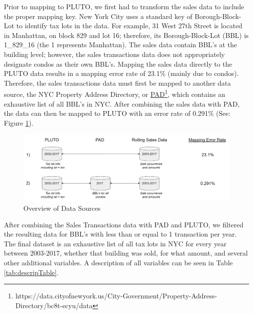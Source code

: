 \documentclass[conference,final,]{IEEEtran}
\makeatletter
\def\maxwidth{\ifdim\Gin@nat@width>\linewidth\linewidth
\else\Gin@nat@width\fi}
\let\Oldincludegraphics\includegraphics
\renewcommand{\includegraphics}[1]{\Oldincludegraphics[width=\maxwidth]{#1}}
\makeatother
\begin{document}
Prior to mapping to PLUTO, we first had to transform the sales data to
include the proper mapping key. New York City uses a standard key of
Borough-Block-Lot to identify tax lots in the data. For example, 31 West
27th Street is located in Manhattan, on block 829 and lot 16; therefore,
its Borough-Block-Lot (BBL) is 1\_829\_16 (the 1 represents Manhattan).
The sales data contain BBL's at the building level; however, the sales
transactions data does not appropriately designate condos as their own
BBL's. Mapping the sales data directly to the PLUTO data results in a
mapping error rate of 23.1\% (mainly due to condos). Therefore, the
sales transactions data must first be mapped to another data source, the
NYC Property Address Directory, or
\href{https://data.cityofnewyork.us/City-Government/Property-Address-Directory/bc8t-ecyu/data}{PAD}\footnote{https://data.cityofnewyork.us/City-Government/Property-Address-Directory/bc8t-ecyu/data},
which contains an exhaustive list of all BBL's in NYC. After combining
the sales data with PAD, the data can then be mapped to PLUTO with an
error rate of 0.291\% (See: Figure \ref{fig:Data Schema}).

\begin{figure}
\centering
\includegraphics{Sections/tables_and_figures/Data_Schema.png}
\caption{\label{fig:Data Schema}Overview of Data Sources}
\end{figure}

After combining the Sales Transactions data with PAD and PLUTO, we
filtered the resulting data for BBL's with less than or equal to 1
transaction per year. The final dataset is an exhaustive list of all tax
lots in NYC for every year between 2003-2017, whether that building was
sold, for what amount, and several other additional variables. A
description of all variables can be seen in Table
\ref{tab:descripTable}.
\end{document}
